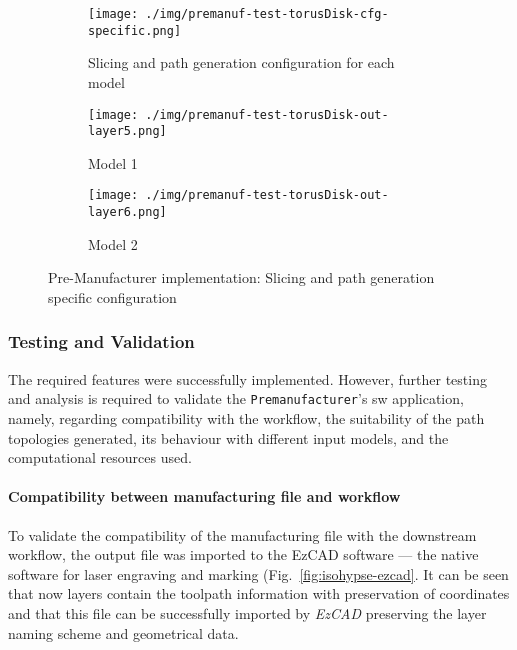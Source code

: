 \begin{figure}[htbp!]
  \centering
  \begin{subfigure}[t]{1.0\textwidth}
  \centering
  \texttt{[image: ./img/premanuf-test-torusDisk-cfg-specific.png]}
  \caption{Slicing and path generation configuration for each model}%
  \label{fig:premanuf-ui-cfg-specific}
  \end{subfigure}
%
  \begin{subfigure}[t]{0.48\textwidth}
  \centering
  \texttt{[image: ./img/premanuf-test-torusDisk-out-layer5.png]}
  \caption{Model 1}%
  \label{fig:premanuf-ui-cfg-out-layer5}
\end{subfigure}
%
  \begin{subfigure}[t]{0.48\textwidth}
  \centering
  \texttt{[image: ./img/premanuf-test-torusDisk-out-layer6.png]}
  \caption{Model 2}%
  \label{fig:premanuf-ui-cfg-out-layer6}
  \end{subfigure}
  \caption{Pre-Manufacturer implementation: Slicing and path generation specific
  configuration}%
  \label{fig:premanuf-ui-cfg-specific-full}
\end{figure}


\subsubsection{Testing and Validation}%
\label{sec:testing-premanuf}
The required features were successfully implemented.
However, further testing and analysis is required to validate the
\texttt{Premanufacturer}'s \gls{sw} application, namely, regarding compatibility
with the workflow, the suitability of the path topologies generated, its
behaviour with different input models, and the computational resources used.

\paragraph{Compatibility between manufacturing file and workflow}
To
validate the compatibility of the manufacturing file with the downstream
workflow, the output file was imported to the EzCAD software --- the native software for
laser engraving and marking (Fig.~\ref{fig:isohypse-ezcad}.
It can be seen that now layers contain the toolpath information
with preservation of coordinates and that this file can be successfully imported
by \emph{EzCAD} preserving the layer naming scheme and geometrical data.

